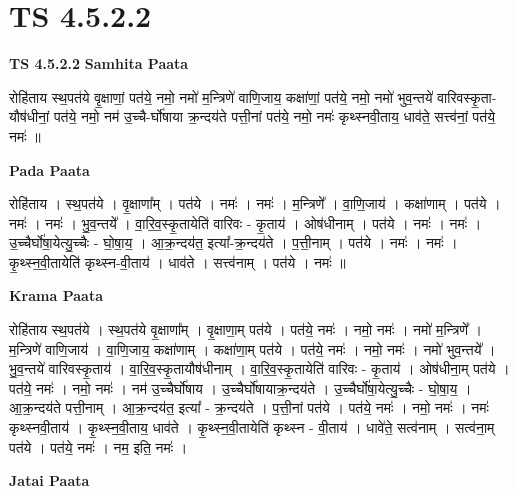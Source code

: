 \documentclass[17pt]{extarticle}
\begin{document}
\section{ TS 4.5.2.2 }

\textbf{TS 4.5.2.2 } \newline
\textbf{Samhita Paata} \newline

रोहि॑ताय स्थ॒पत॑ये वृ॒क्षाणां॒ पत॑ये॒ नमो॒                                      नमो॑ म॒न्त्रिणे॑ वाणि॒जाय॒ कक्षा॑णां॒ पत॑ये॒ नमो॒                          नमो॑ भुव॒न्तये॑ वारिवस्कृ॒ता-यौष॑धीनां॒ पत॑ये॒ नमो॒   नम॑ उ॒च्चै-र्घो॑षाया क्र॒न्दय॑ते पत्ती॒नां पत॑ये॒ नमो॒                    नमः॑ कृथ्स्नवी॒ताय॒ धाव॑ते॒ सत्त्व॑नां॒ पत॑ये॒ नमः॑ ॥ \newline

\textbf{Pada Paata} \newline

रोहि॑ताय । स्थ॒पत॑ये । वृ॒क्षाणा᳚म् । पत॑ये । नमः॑ । नमः॑ । म॒न्त्रिणे᳚ । वा॒णि॒जाय॑ । कक्षा॑णाम् । पत॑ये । नमः॑ । नमः॑ । भु॒व॒न्तये᳚ । वा॒रि॒व॒स्कृ॒तायेति॑ वारिवः - कृ॒ताय॑ । ओष॑धीनाम् । पत॑ये । नमः॑ । नमः॑ । उ॒च्चैर्घो॑षा॒येत्यु॒च्चैः - घो॒षा॒य॒ । आ॒क्र॒न्दय॑त॒ इत्या᳚-क्र॒न्दय॑ते । प॒त्ती॒नाम् । पत॑ये । नमः॑ । नमः॑ । कृ॒थ्स्न॒वी॒तायेति॑ कृथ्स्न-वी॒ताय॑ । धाव॑ते । सत्त्व॑नाम् । पत॑ये । नमः॑ ॥  \newline


\textbf{Krama Paata} \newline

रोहि॑ताय स्थ॒पत॑ये । स्थ॒पत॑ये वृ॒क्षाणा᳚म् । वृ॒क्षाणा॒म् पत॑ये । पत॑ये॒ नमः॑ । नमो॒ नमः॑ । नमो॑ म॒न्त्रिणे᳚ । म॒न्त्रिणे॑ वाणि॒जाय॑ । वा॒णि॒जाय॒ कक्षा॑णाम् । कक्षा॑णा॒म् पत॑ये । पत॑ये॒ नमः॑ । नमो॒ नमः॑ । नमो॑ भुव॒न्तये᳚ । भु॒व॒न्तये॑ वारिवस्कृ॒ताय॑ । वा॒रि॒व॒स्कृ॒तायौष॑धीनाम् । वा॒रि॒व॒स्कृ॒तायेति॑ वारिवः - कृ॒ताय॑ । ओष॑धीना॒म् पत॑ये । पत॑ये॒ नमः॑ । नमो॒ नमः॑ । नम॑ उ॒च्चैर्घो॑षाय । उ॒च्चैर्घो॑षायाक्र॒न्दय॑ते । उ॒च्चैर्घो॑षा॒येत्यु॒च्चैः - घो॒षा॒य॒ । आ॒क्र॒न्दय॑ते पत्ती॒नाम् । आ॒क्र॒न्दय॑त॒ इत्या᳚ - क्र॒न्दय॑ते । प॒त्ती॒नां पत॑ये । पत॑ये॒ नमः॑ । नमो॒ नमः॑ । नमः॑ कृथ्स्नवी॒ताय॑ । कृ॒थ्स्न॒वी॒ताय॒ धाव॑ते । कृ॒थ्स्न॒वी॒तायेति॑ कृथ्स्न - वी॒ताय॑ । धावे॑ते॒ सत्व॑नाम् । सत्व॑ना॒म् पत॑ये । पत॑ये॒ नमः॑ । नम॒ इति॒ नमः॑ । \newline

\textbf{Jatai Paata} \newline
\end{document}
